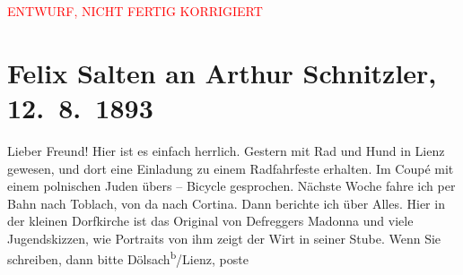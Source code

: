 
\begin{center}
            \textcolor{red}{ENTWURF, NICHT FERTIG KORRIGIERT}
                      \end{center}
            
         
         \renewcommand{\erwaehntePersonen}{Personen: Franz Defregger, Gustav Schwarzkopf, Emil Schwarzkopf, Max Schwarzkopf, Rudolf Schwarzkopf}
         \renewcommand{\erwaehnteOrte}{Orte: Cortina d'Ampezzo, Dölsach, Lienz, Pfarrkirche Dölsach, Toblach, Wien}
         \renewcommand{\erwaehnteWerke}{Werke: Heilige Familie}
               \section[Felix Salten an Arthur Schnitzler, 12. 8. 1893]{ Felix Salten an Arthur Schnitzler, 12. 8. 1893}\nopagebreak{}\rehead{ }\begin{ledgroupsized}[t]{13cm}\normalsize\beginnumbering \toendnotes[C]{\smallbreak\pagebreak[2]} 
\toendnotes[C]{\smallbreak}\pstart
           \noindent{}{\pb}Lieber Freund! Hier ist es einfach herrlich. Gestern mit Rad und
               Hund in Lienz gewesen, und dort eine Einladung zu einem
               Radfahrfeste erhalten. Im Coupé mit einem polnischen Juden übers – Bicycle
               gesprochen. Nächste Woche fahre ich per Bahn nach Toblach, von da nach Cortina. Dann
               berichte ich über Alles. \pend
           \pstart
           Hier in der kleinen Dorfkirche ist das Original von Defreggers Madonna und viele
               Jugendskizzen, wie Portraits von ihm zeigt der Wirt in seiner Stube. \pend
           \pstart
           Wenn Sie schreiben, dann {\pb}bitte
                  Dölsach\textsuperscript{b}/Lienz, poste

\end{ledgroupsized}
